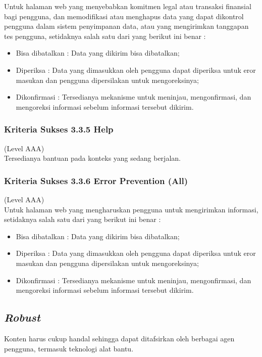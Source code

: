 Untuk halaman web yang menyebabkan komitmen legal atau transaksi finansial bagi pengguna, dan memodifikasi atau menghapus data yang dapat dikontrol pengguna dalam sistem penyimpanan data, atau yang mengirimkan tanggapan tes pengguna, setidaknya salah satu dari yang berikut ini benar :

\begin{itemize}
	\item Bisa dibatalkan : Data yang dikirim bisa dibatalkan;
	\item Diperiksa : Data yang dimasukkan oleh pengguna dapat diperiksa untuk eror masukan dan pengguna dipersilakan untuk mengoreksinya;
	\item Dikonfirmasi : Tersedianya mekanisme untuk meninjau, mengonfirmasi, dan mengoreksi informasi sebelum informasi tersebut dikirim.
\end{itemize}


\subsubsection{Kriteria Sukses 3.3.5 Help}
\label{sec:kriteria_3.3.5}
(Level AAA) \\

Tersedianya bantuan pada konteks yang sedang berjalan.


\subsubsection{Kriteria Sukses 3.3.6 Error Prevention (All)}
\label{sec:kriteria_3.3.6}
(Level AAA) \\

Untuk halaman web yang mengharuskan pengguna untuk mengirimkan informasi, setidaknya salah satu dari yang berikut ini benar :

\begin{itemize}
	\item Bisa dibatalkan : Data yang dikirim bisa dibatalkan;
	\item Diperiksa : Data yang dimasukkan oleh pengguna dapat diperiksa untuk eror masukan dan pengguna dipersilakan untuk mengoreksinya;
	\item Dikonfirmasi : Tersedianya mekanisme untuk meninjau, mengonfirmasi, dan mengoreksi informasi sebelum informasi tersebut dikirim.
\end{itemize}

\subsection{\textit{Robust}}
Konten harus cukup handal sehingga dapat ditafsirkan oleh berbagai agen pengguna, termasuk teknologi alat bantu.

